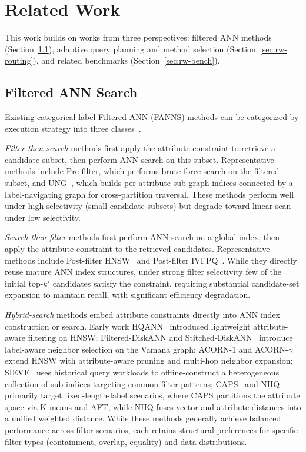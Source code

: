 \section{Related Work}
\label{sec:relatedwork}


This work builds on works from three perspectives: filtered ANN methods (Section~\ref{sec:rw-fanns}), adaptive query planning and method selection (Section~\ref{sec:rw-routing}), and related benchmarks (Section~\ref{sec:rw-bench}).

\subsection{Filtered ANN Search}
\label{sec:rw-fanns}

Existing categorical-label Filtered ANN (FANNS) methods can be categorized by execution strategy into three classes~\cite{FilteredANNBenchmark2024}.

\textit{Filter-then-search} methods first apply the attribute constraint to retrieve a candidate subset, then perform ANN search on this subset. Representative methods include Pre-filter, which performs brute-force search on the filtered subset, and UNG~\cite{UNG2024}, which builds per-attribute sub-graph indices connected by a label-navigating graph for cross-partition traversal. These methods perform well under high selectivity (small candidate subsets) but degrade toward linear scan under low selectivity.

\textit{Search-then-filter} methods first perform ANN search on a global index, then apply the attribute constraint to the retrieved candidates. Representative methods include Post-filter HNSW~\cite{HNSW2018} and Post-filter IVFPQ~\cite{FaissGPUIVFPQ2019}. While they directly reuse mature ANN index structures, under strong filter selectivity few of the initial top-$k'$ candidates satisfy the constraint, requiring substantial candidate-set expansion to maintain recall, with significant efficiency degradation.

\textit{Hybrid-search} methods embed attribute constraints directly into ANN index construction or search. Early work HQANN~\cite{HQANN2022} introduced lightweight attribute-aware filtering on HNSW; Filtered-DiskANN and Stitched-DiskANN~\cite{FilteredStitchedVamana2023} introduce label-aware neighbor selection on the Vamana graph; ACORN-1 and ACORN-$\gamma$~\cite{ACORN2024} extend HNSW with attribute-aware pruning and multi-hop neighbor expansion; SIEVE~\cite{SIEVE2025} uses historical query workloads to offline-construct a heterogeneous collection of sub-indices targeting common filter patterns; CAPS~\cite{CAPS2023} and NHQ~\cite{NHQNPG2023} primarily target fixed-length-label scenarios, where CAPS partitions the attribute space via K-means and AFT, while NHQ fuses vector and attribute distances into a unified weighted distance. While these methods generally achieve balanced performance across filter scenarios, each retains structural preferences for specific filter types (containment, overlap, equality) and data distributions.


